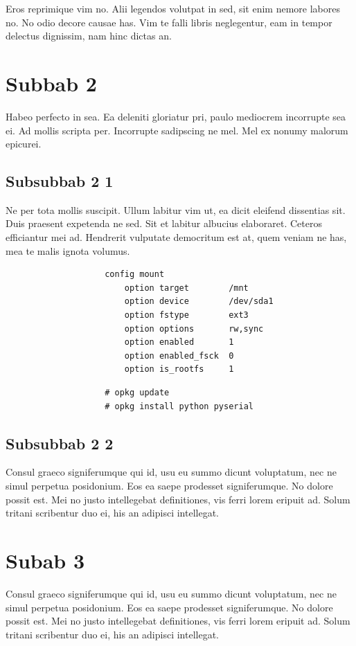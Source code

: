 		Eros reprimique vim no. Alii legendos volutpat in sed, sit enim nemore labores no. No odio decore causae has. Vim te falli libris neglegentur, eam in tempor delectus dignissim, nam hinc dictas an.
	
	\section{Subbab 2}		
		Habeo perfecto in sea. Ea deleniti gloriatur pri, paulo mediocrem incorrupte sea ei. Ad mollis scripta per. Incorrupte sadipscing ne mel. Mel ex nonumy malorum epicurei.

		\subsection{Subsubbab 2 1}
			Ne per tota mollis suscipit. Ullum labitur vim ut, ea dicit eleifend dissentias sit. Duis praesent expetenda ne sed. Sit et labitur albucius elaboraret. Ceteros efficiantur mei ad. Hendrerit vulputate democritum est at, quem veniam ne has, mea te malis ignota volumus.
			
			\begingroup
			    \fontsize{10pt}{12pt}\selectfont
			    \begin{verbatim}
					config mount
				        option target        /mnt
				        option device        /dev/sda1
				        option fstype        ext3
				        option options       rw,sync
				        option enabled       1
				        option enabled_fsck  0
				        option is_rootfs     1
			    \end{verbatim}  
			\endgroup

			\begingroup
			    \fontsize{10pt}{12pt}\selectfont
			    \begin{verbatim}
					# opkg update
					# opkg install python pyserial
			    \end{verbatim}  
			\endgroup			

		\subsection{Subsubbab 2 2}
			Consul graeco signiferumque qui id, usu eu summo dicunt voluptatum, nec ne simul perpetua posidonium. Eos ea saepe prodesset signiferumque. No dolore possit est. Mei no justo intellegebat definitiones, vis ferri lorem eripuit ad. Solum tritani scribentur duo ei, his an adipisci intellegat.

	\section{Subab 3}
		Consul graeco signiferumque qui id, usu eu summo dicunt voluptatum, nec ne simul perpetua posidonium. Eos ea saepe prodesset signiferumque. No dolore possit est. Mei no justo intellegebat definitiones, vis ferri lorem eripuit ad. Solum tritani scribentur duo ei, his an adipisci intellegat.
			
			


